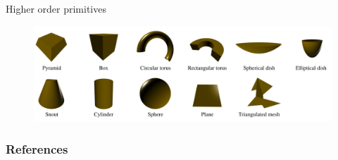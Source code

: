 \documentclass{beamer}
\begin{document}
\begin{frame}{Higher order primitives}
	
	\begin{figure}[ht!]
		\centering
		\includegraphics[width=0.9\linewidth]{figures/hops.png}
	\end{figure}
\end{frame}

\begin{frame}[allowframebreaks]
	\frametitle{References}
	
	
\end{frame}
\end{document}
